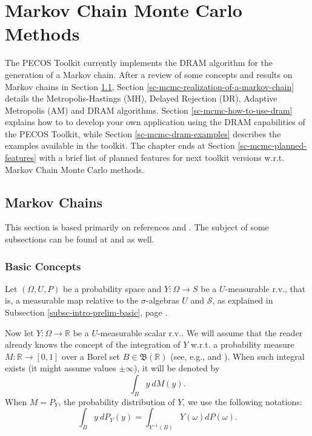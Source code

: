 \chapter{Markov Chain Monte Carlo Methods}\label{ch-mcmc}
\thispagestyle{headings}

The PECOS Toolkit currently implements the DRAM algorithm \cite{HaLaMiSa06} for the generation of a Markov chain.
After a review of some concepts and results on Markov chains in Section \ref{sc-mcmc-markov-chains},
Section \ref{sc-mcmc-realization-of-a-markov-chain} details the
Metropolis-Hastings (MH),
Delayed Rejection (DR),
Adaptive Metropolis (AM) and
DRAM algorithms.
Section \ref{sc-mcmc-how-to-use-dram} explains how to to develop your own application using the DRAM capabilities of the PECOS Toolkit, while
Section \ref{sc-mcmc-dram-examples} describes the examples available in the toolkit.
The chapter ends at Section \ref{sc-mcmc-planned-features} with a brief list of planned features for next toolkit versions w.r.t. Markov Chain Monte Carlo methods.

\section{Markov Chains}\label{sc-mcmc-markov-chains}

This section 
is based primarily on references \cite{Du05} and \cite{JaPr04}.
The subject of some subsections can be found at \cite{KaSo05} and \cite{Ro96} as well.

\subsection{Basic Concepts}

Let $(\Omega,U,P)$ be a probability space and $Y:\Omega\rightarrow S$ be a $U$-measurable r.v.,
that is, a measurable map relative to the $\sigma$-algebras $U$ and $\mathcal{S}$,
as explained in Subsection \ref{subsc-intro-prelim-basic}, page \pageref{subsc-intro-prelim-basic}.

Now let $Y:\Omega\rightarrow\mathbb{R}$ be a $U$-measurable scalar r.v..
We will assume that the reader already knows the concept of the
integration of $Y$
w.r.t. a probability measure $M:\mathbb{R}\rightarrow [0,1]$
over a Borel set $B\in\mathfrak{B}(\mathbb{R})$ (see, e.g., \cite[Section A.4]{Du05} and \cite[Chapter 9]{JaPr04}).
When such integral exists (it might assume values $\pm\infty$), it will be denoted by
\begin{equation*}
\int_B y~dM(y).
\end{equation*}
When $M=P_Y$, the probability distribution of $Y$, we use the following notations:
\begin{equation*}
\int_B y~dP_Y(y) = 
\int_{Y^{-1}(B)}Y(\omega)dP(\omega).
\end{equation*}

